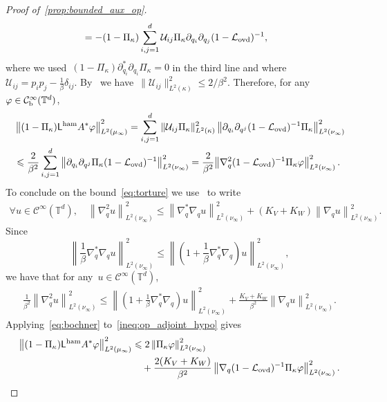 \documentclass[onefignum,onetabnum]{siamart251216} %
\newcommand{\norm}[1]{\left\lVert#1\right\rVert}
\newcommand{\torus}{\mathbb T}
\newcommand{\mc}[1]{\mathcal{#1}}
\renewcommand{\leq}{\leqslant}
\newcommand{\mescin}{\mu}
\newcommand{\mespos}{\nu}
\newcommand{\mesvit}{\kappa}
\newcommand{\projvit}{\Pi_{\kappa}}
\newcommand{\Lham}{\mathsf{L}^{\rm{ham}}}
\newcommand{\Lovd}{\mc{L}_{\rm{ovd}}}
\newcommand{\norml}[1]{\norm{#1}_{L^2(\mescin_\infty)}}
\newcommand{\vq}[1]{q^{#1}}
\theoremstyle{plain}
\numberwithin{equation}{section}
\numberwithin{theorem}{section}
\begin{document}
\begin{proof}[{Proof of~\cref{prop:bounded_aux_op}}]
\begin{align*}
    &= -(1-\projvit)\sum_{i,j=1}^{d}\mc{U}_{ij}\projvit\partial_{q_i}\partial_{q_j} (1-\Lovd)^{-1},
\end{align*}
where we used~$(1-\projvit)\partial^*_{q_i}\partial_{q_i}\projvit = 0$ in the third line and where~$\mc{U}_{ij} = p_i p_j -\frac{1}{\beta}\delta_{ij}$. By~\cite[Lemma A.2]{roussel2018spectral} we have~$\|\mc{U}_{ij}\|_{L^2(\mesvit)}^2 \leq 2/\beta^2$. Therefore, for any~$\varphi\in\mc{C}_{\rm b}^\infty(\torus^d)$,
\begin{align}
    \notag
    &\norml{(1-\projvit)\Lham A^* \varphi}^2
    = \sum_{i,j=1}^{d}\|\mc{U}_{ij}\projvit\|_{L^2(\mesvit)}^2\left\|\partial_{q_i}\partial_{\vq{j}}(1-\Lovd)^{-1}\projvit\right\|_{L^2(\mespos_\infty)}^2 \\
    \label{ineq:op_adjoint_hypo}
    &\leq \frac{2}{\beta^2}\sum_{i,j=1}^{d}\left\|\partial_{q_i}\partial_{\vq{j}}\projvit(1-\Lovd)^{-1}\right\|_{L^2(\mespos_\infty)}^2
        = \frac{2}{\beta^2}\!\left\|\nabla_q^2 (1-\Lovd)^{-1}\projvit\varphi\right\|_{L^2(\mespos_\infty)}^2.
\end{align}
To conclude on the bound~\eqref{eq:torture} we use~\cite[Lemma 3.6]{bernard2022hypocoercivity} to write
    \begin{align*}
        \forall u\in\mc{C}^\infty(\torus^d), \quad\left\|\nabla_q^2 u\right\|_{L^2(\mespos_\infty)}^2 \leq \left\|\nabla_q^*\nabla_q u\right\|_{L^2(\mespos_\infty)}^2 + (K_V + K_W)\left\|\nabla_q u\right\|_{L^2(\mespos_\infty)}^2.
    \end{align*}
Since
$$
\left\|\displaystyle\!\frac{1}{\beta}\nabla_q^*\nabla_q u\right\|_{L^2(\mespos_\infty)}^2\leq\left\|\!\left(1+\displaystyle\frac{1}{\beta}\nabla_q^*\nabla_q\right)\! u\right\|_{L^2(\mespos_\infty)}^2,
$$
we have that for any~$u\in\mc{C}^\infty(\torus^d)$,
\begin{align}
    \label{eq:bochner}
   \frac{1}{\beta^2}\left\|\nabla_q^2 u\right\|_{L^2(\mespos_\infty)}^2 \leq \left\|\!\left(1+\displaystyle\frac{1}{\beta}\nabla_q^*\nabla_q\right)\! u\right\|_{L^2(\mespos_\infty)}^2 + \frac{K_V + K_W}{\beta^2}\left\|\nabla_q u\right\|_{L^2(\mespos_\infty)}^2.
\end{align}
Applying~\eqref{eq:bochner} to~\eqref{ineq:op_adjoint_hypo} gives
\begin{align*}
    \norml{(1-\projvit)\Lham A^* \varphi}^2 &\leq 2\left\|\projvit\varphi\right\|_{L^2(\mespos_\infty)}^2 \\
    &\quad + \frac{2(K_V + K_W)}{\beta^2}\left\|\nabla_q (1-\Lovd)^{-1}\projvit\varphi\right\|_{L^2(\mespos_\infty)}^2.

\end{align*}
\end{proof}
\end{document}
